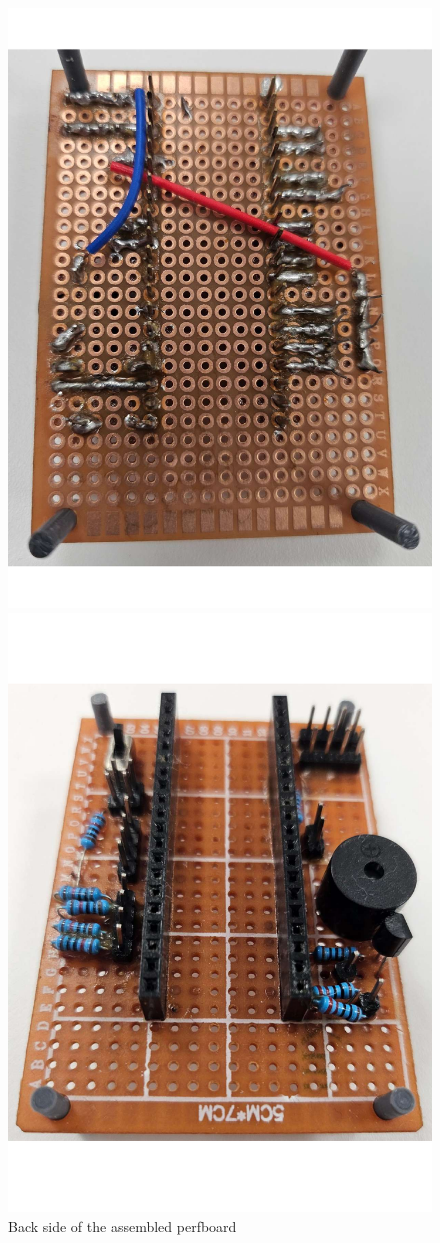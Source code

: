 \begin{figure}[h]
    \centering
    \begin{minipage}[b]{0.45\textwidth}
        \centering
        \includegraphics[width=.8\textwidth]{Imagenes/Vectorial/perfboard_assembled_back.pdf}
        \caption{Back side of the assembled perfboard}
        \label{fig:perfboard_assembled_back}
    \end{minipage}
    \hfill
    \begin{minipage}[b]{0.45\textwidth}
        \centering
        \includegraphics[width=.8\textwidth]{Imagenes/Vectorial/perfboard_assembled_front.pdf}

\end{minipage}
\end{figure}
